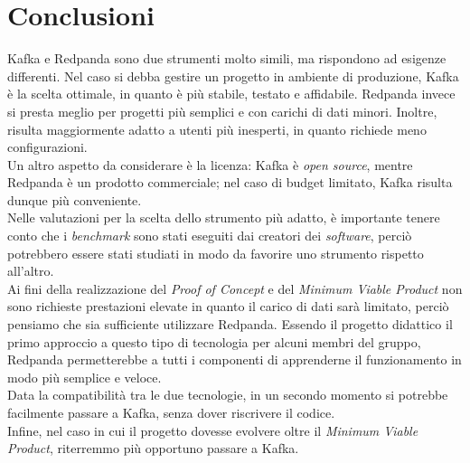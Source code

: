 \section{Conclusioni}
Kafka e Redpanda sono due strumenti molto simili, ma rispondono ad esigenze differenti.
Nel caso si debba gestire un progetto in ambiente di produzione, Kafka è la scelta ottimale, in quanto è più stabile, testato e affidabile.
Redpanda invece si presta meglio per progetti più semplici e con carichi di dati minori. Inoltre, risulta maggiormente adatto a utenti più
inesperti, in quanto richiede meno configurazioni. \\
Un altro aspetto da considerare è la licenza: Kafka è \textit{open source}, mentre Redpanda è un prodotto commerciale; nel caso di
budget limitato, Kafka risulta dunque più conveniente.\\
Nelle valutazioni per la scelta dello strumento più adatto, è importante tenere conto che i \textit{benchmark} sono stati eseguiti dai creatori dei \textit{software},
perciò potrebbero essere stati studiati in modo da favorire uno strumento rispetto all'altro.\\
Ai fini della realizzazione del \textit{Proof of Concept} e del \textit{Minimum Viable Product} non sono richieste prestazioni elevate in quanto
il carico di dati sarà limitato, perciò pensiamo che sia sufficiente utilizzare Redpanda.
Essendo il progetto didattico il primo approccio a questo tipo di tecnologia per alcuni membri del gruppo, Redpanda permetterebbe a tutti i componenti di apprenderne
il funzionamento in modo più semplice e veloce.\\
Data la compatibilità tra le due tecnologie, in un secondo momento si potrebbe facilmente passare a Kafka, senza dover riscrivere il codice.\\
Infine, nel caso in cui il progetto dovesse evolvere oltre il \textit{Minimum Viable Product}, riterremmo più opportuno passare a Kafka.




